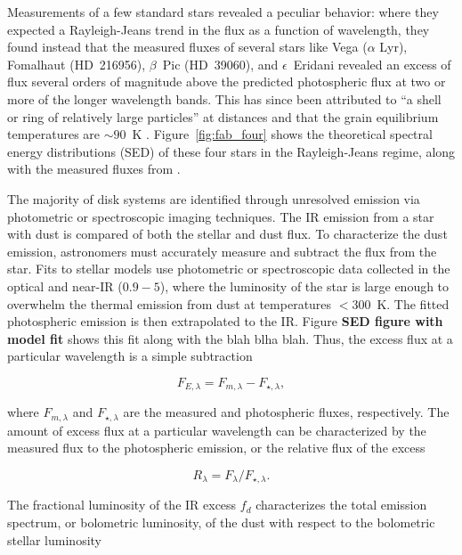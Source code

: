     
    
    Measurements of a few standard stars revealed a peculiar behavior: where they expected a Rayleigh-Jeans trend in the flux as a function of wavelength, they found instead that the measured fluxes of several stars like Vega ($\alpha$ Lyr), Fomalhaut (HD~216956), $\beta$~Pic (HD~39060), and $\epsilon$~Eridani revealed an excess of flux several orders of magnitude above the predicted photospheric flux at two or more of the longer wavelength bands. This has since been attributed to ``a shell or ring of relatively large particles'' at distances and that the grain equilibrium temperatures are $\sim90$~K \citep{Aumann1984, Backman1993}. Figure~\ref{fig:fab_four} shows the theoretical spectral energy distributions (SED) of these four stars in the Rayleigh-Jeans regime, along with the measured fluxes from \iras.
    

    The majority of disk systems are identified through unresolved emission via photometric or spectroscopic imaging techniques. The IR emission from a star with dust is compared of both the stellar and dust flux. To characterize the dust emission, astronomers must accurately measure and subtract the flux from the star. Fits to stellar models use photometric or spectroscopic data collected in the optical and near-IR ($0.9-5$\micron), where the luminosity of the star is large enough to overwhelm the thermal emission from dust at temperatures $<300$~K. The fitted photospheric emission is then extrapolated to the IR. Figure \textbf{SED figure with model fit} shows this fit along with the blah blha blah. Thus, the excess flux at a particular wavelength is a simple subtraction
    
    \begin{equation}\label{eq:excess+flux}
    F_{E,\lambda} = F_{m,\lambda} - F_{\star,\lambda},
    \end{equation}
    
    \noindent where $F_{m,\lambda}$ and $F_{\star,\lambda}$ are the measured and photospheric fluxes, respectively. The amount of excess flux at a particular wavelength can be characterized by the measured flux to the photospheric emission, or the relative flux of the excess
        
        \begin{equation}\label{eq:rel_excess}
        R_\lambda = F_\lambda / F_{\star,\lambda}.
        \end{equation}
        
        \noindent The fractional luminosity of the IR excess $f_d$ characterizes the total emission spectrum, or bolometric luminosity, of the dust with respect to the bolometric stellar luminosity
        

